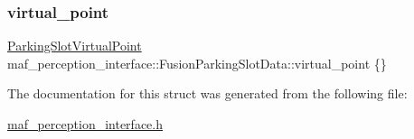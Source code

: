 \subsubsection{\texorpdfstring{virtual\+\_\+point}{virtual\_point}}
{\footnotesize\ttfamily \hyperlink{structmaf__perception__interface_1_1ParkingSlotVirtualPoint}{Parking\+Slot\+Virtual\+Point} maf\+\_\+perception\+\_\+interface\+::\+Fusion\+Parking\+Slot\+Data\+::virtual\+\_\+point \{\}}



The documentation for this struct was generated from the following file\+:\begin{DoxyCompactItemize}
\item 
\hyperlink{maf__perception__interface_8h}{maf\+\_\+perception\+\_\+interface.\+h}\end{DoxyCompactItemize}
